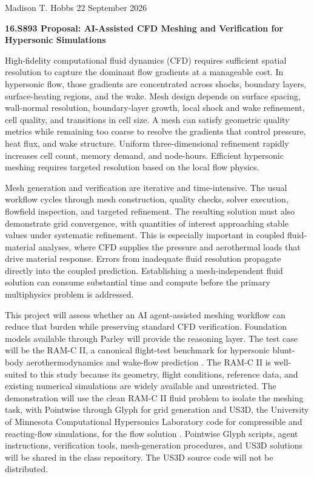 \documentclass[11pt]{article}
\begin{document}
\noindent
{\small Madison T. Hobbs}
\hfill
{\small 22 September 2026}

\vspace{0.25em}

\begin{center}
    {\normalsize \textbf{16.S893 Proposal: AI-Assisted CFD Meshing and Verification for Hypersonic Simulations}}
\end{center}

\vspace{0.35em}
High-fidelity computational fluid dynamics (CFD) requires sufficient spatial resolution to capture the dominant flow gradients at a manageable cost. 
In hypersonic flow, those gradients are concentrated across shocks, boundary layers, surface-heating regions, and the wake. 
Mesh design depends on surface spacing, wall-normal resolution, boundary-layer growth, local shock and wake refinement, cell quality, and transitions in cell size. 
A mesh can satisfy geometric quality metrics while remaining too coarse to resolve the gradients that control pressure, heat flux, and wake structure. 
Uniform three-dimensional refinement rapidly increases cell count, memory demand, and node-hours. 
Efficient hypersonic meshing requires targeted resolution based on the local flow physics.

Mesh generation and verification are iterative and time-intensive. 
The usual workflow cycles through mesh construction, quality checks, solver execution, flowfield inspection, and targeted refinement. 
The resulting solution must also demonstrate grid convergence, with quantities of interest approaching stable values under systematic refinement. 
This is especially important in coupled fluid-material analyses, where CFD supplies the pressure and aerothermal loads that drive material response. 
Errors from inadequate fluid resolution propagate directly into the coupled prediction. 
Establishing a mesh-independent fluid solution can consume substantial time and compute before the primary multiphysics problem is addressed.

This project will assess whether an AI agent-assisted meshing workflow can reduce that burden while preserving standard CFD verification. 
Foundation models available through Parley will provide the reasoning layer. 
The test case will be the RAM-C II, a canonical flight-test benchmark for hypersonic blunt-body aerothermodynamics and wake-flow prediction \cite{Jones1972ElectrostaticProbePlasmaParameters}. 
The RAM-C II is well-suited to this study because its geometry, flight conditions, reference data, and existing numerical simulations are widely available and unrestricted. 
The demonstration will use the clean RAM-C II fluid problem to isolate the meshing task, with Pointwise through Glyph for grid generation and US3D, the University of Minnesota Computational Hypersonics Laboratory code for compressible and reacting-flow simulations, for the flow solution \cite{Candler2015US3DDevelopment}.
Pointwise Glyph scripts, agent instructions, verification tools, mesh-generation procedures, and US3D solutions will be shared in the class repository. The US3D source code will not be distributed.
\end{document}
